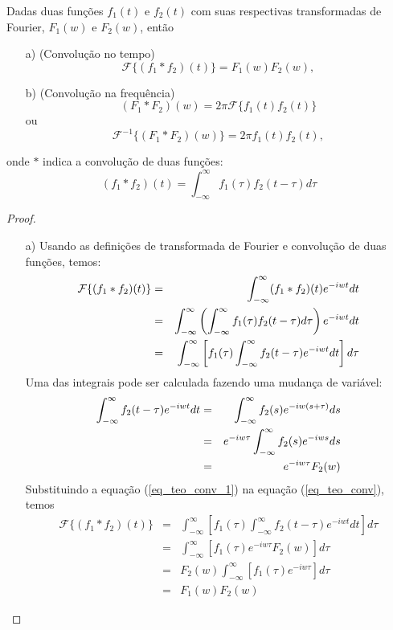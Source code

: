 \begin{propr} \label{prop_teo_conv} Dadas duas funções $f_1(t)$ e $f_2(t)$ com suas respectivas transformadas de Fourier, $F_1(w)$ e $F_2(w)$, então
\begin{itemize}
\item[a)] (Convolução no tempo)
$$\mathcal{F}\{(f_1*f_2)(t)\}=F_1(w)F_2(w),$$
\item[b)] (Convolução na frequência)
$$(F_1*F_2)(w)=2\pi\mathcal{F}\{f_1(t)f_2(t)\}$$
ou 
$$\mathcal{F}^{-1}\{(F_1*F_2)(w)\}=2\pi f_1(t)f_2(t),$$
\end{itemize}
onde $*$ indica a convolução de duas funções:
$$
(f_1*f_2)(t)=\int_{-\infty}^\infty f_1(\tau)f_2(t-\tau)d\tau
$$
\end{propr}
\begin{proof}
\begin{itemize}
\item[a)] Usando as definições de transformada de Fourier e convolução de duas funções, temos:
\begin{eqnarray}
\nonumber \mathcal{F}\{(f_1*f_2)(t)\}&=&\int_{-\infty}^\infty (f_1*f_2)(t)e^{-iwt}dt\\
\nonumber &=&\int_{-\infty}^\infty \left(\int_{-\infty}^\infty f_1(\tau)f_2(t-\tau)d\tau\right)e^{-iwt}dt\\
&=&\int_{-\infty}^\infty \left[f_1(\tau) \int_{-\infty}^\infty f_2(t-\tau)e^{-iwt}dt\right]d\tau  {\label{eq_teo_conv}}
\end{eqnarray}
Uma das integrais pode ser calculada fazendo uma mudança de variável:
\begin{eqnarray}
\nonumber \int_{-\infty}^\infty f_2(t-\tau)e^{-iwt}dt&=&\int_{-\infty}^\infty f_2(s)e^{-iw(s+\tau)}ds \\
\nonumber &=&e^{-iw\tau}\int_{-\infty}^\infty f_2(s)e^{-iws}ds \\
&=&e^{-iw\tau}F_2(w) {\label{eq_teo_conv_1}}
\end{eqnarray}
Substituindo a equação (\ref{eq_teo_conv_1}) na equação (\ref{eq_teo_conv}), temos
\begin{eqnarray*}
\mathcal{F}\{(f_1*f_2)(t)\}&=&\int_{-\infty}^\infty \left[f_1(\tau) \int_{-\infty}^\infty f_2(t-\tau)e^{-iwt}dt\right]d\tau\\
&=&\int_{-\infty}^\infty \left[f_1(\tau) e^{-iw\tau}F_2(w)\right]d\tau\\
&=&F_2(w)\int_{-\infty}^\infty \left[f_1(\tau) e^{-iw\tau}\right]d\tau\\
&=&F_1(w)F_2(w)
\end{eqnarray*}


\end{itemize}
\end{proof}

